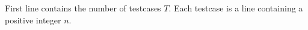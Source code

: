 First line contains the number of testcases $T$. 
Each testcase is a line containing a positive integer $n$. 


